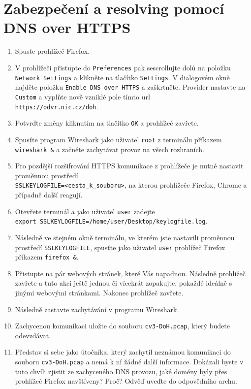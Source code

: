 \section{Zabezpečení a resolving pomocí DNS over HTTPS}
\begin{enumerate}
    \item Spusťe prohlížeč Firefox.
    \item V prohlížeči přistupte do \texttt{Preferences} pak sescrollujte dolů na položku \texttt{Network Settings} a klikněte na tlačítko \texttt{Settings}. V dialogovém okně najděte položku \texttt{Enable DNS over HTTPS} a zaškrtněte. Provider nastavte na \texttt{Custom} a vyplňte nově vzniklé pole tímto url\\ \texttt{https://odvr.nic.cz/doh}.
    \item Potvrďte změny kliknutím na tlačítko \texttt{OK} a prohlížeč zavřete.
    \item Spusťte program Wireshark jako uživatel \texttt{root} z terminálu příkazem \texttt{wireshark \&} a začněte zachytávat provoz na všech rozhraních.
    \item Pro pozdější rozšifrování HTTPS komunikace z prohlížeče je nutné nastavit proměnnou prostředí\\ \texttt{SSLKEYLOGFILE=<cesta\_k\_souboru>}, na kterou prohlížeče Firefox, Chrome a případně další reagují.
    \item Otevřete terminál a jako uživatel \texttt{user} zadejte\\ \texttt{export SSLKEYLOGFILE=/home/user/Desktop/keylogfile.log}.
    \item Následně ve stejném okně terminálu, ve kterém jste nastavili proměnnou prostředí \texttt{SSLKEYLOGFILE}, spusťte jako uživatel \texttt{user} prohlížeč Firefox příkazem \texttt{firefox \&}.
    \item Přistupte na pár webových stránek, které Vás napadnou. Následně prohlížeč zavřete a tuto akci ještě jednou či vícekrát zopakujte, pokaždé ideálně s jinými webovými stránkami. Nakonec prohlížeč zavřete.
    \item Následně zastavte zachytávání v programu Wireshark.
    \item Zachycenou komunikaci uložte do souboru \texttt{cv3-DoH.pcap}, který budete odevzdávat.
	\item Představ si sebe jako útočníka, který zachytil neznámou komunikaci do souboru \texttt{cv3-DoH.pcap} a nemá k ní žádné další informace. Dokázali byste v tuto chvíli zjistit ze zachyceného DNS provozu, jaké domény byly přes prohlížeč Firefox navštíveny? Proč? Odvěď uveďte do odpovědního archu.

\end{enumerate}
